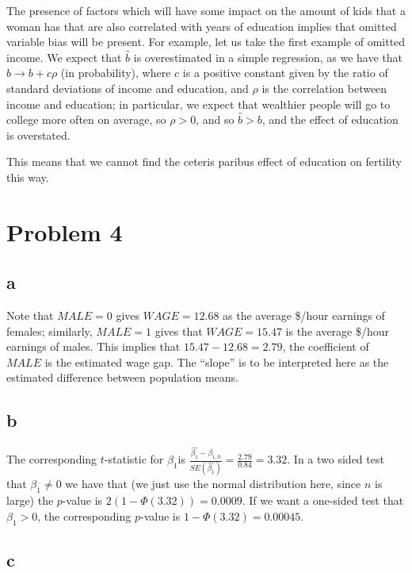 \documentclass[12pt,letterpaper]{article}
\theoremstyle{definition}
\begin{document}
The presence of factors which will have some impact on the amount of kids that a woman has that are also correlated with years of education implies that omitted variable bias will be present. For example, let us take the first example of omitted income. We expect that \(\hat{b}\) is overestimated in a simple regression, as we have that \(\hat{b} \rightarrow b + c\rho\) (in probability), where \(c\) is a positive constant given by the ratio of standard deviations of income and education, and \(\rho\) is the correlation between income and education; in particular, we expect that wealthier people will go to college more often on average, so \(\rho > 0\), and so \(\hat{b} > b\), and the effect of education is overstated.

This means that we cannot find the ceteris paribus effect of education on fertility this way.

\section*{Problem 4}

\subsection*{a}

Note that \(MALE = 0\) gives \(WAGE = 12.68\) as the average \$/hour earnings of females; similarly, \(MALE=1\) gives that \(WAGE = 15.47\) is the average \$/hour earnings of males. This implies that \(15.47 - 12.68 = 2.79\), the coefficient of \(MALE\) is the estimated wage gap. The ``slope'' is to be interpreted here as the estimated difference between population means.

\subsection*{b}

The corresponding \(t\)-statistic for \(\beta_{1}\)is \(\frac{\hat{\beta_{1}} - \beta_{1,0}}{SE(\hat{\beta_{1}})} = \frac{2.79}{0.84} = 3.32\). In a two sided test that \(\beta_{1} \neq 0\) we have that (we just use the normal distribution here, since \(n\) is large) the \(p\)-value is \(2(1-\Phi(3.32)) = 0.0009\). If we want a one-sided test that \(\beta_{1} > 0\), the corresponding \(p\)-value is \(1 - \Phi(3.32) = 0.00045\).

\subsection*{c}
\end{document}
